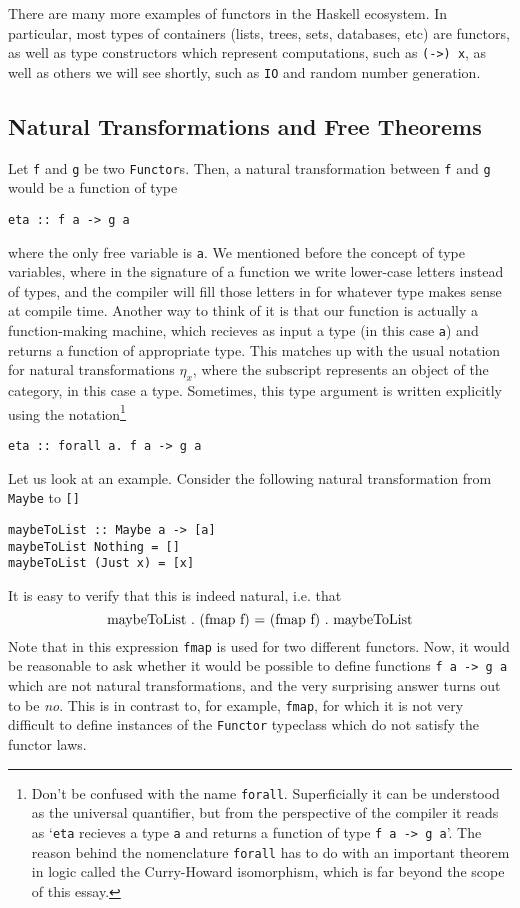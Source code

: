 \documentclass[11pt]{article}
\theoremstyle{nonumberplain}
\newcommand*\lsin{\lstinline}
\newcommand*\lsmath[1]{\text{\lstinline|#1|}}
\begin{document}
There are many more examples of functors in the Haskell ecosystem. In particular, most types of containers (lists, trees, sets, databases, etc) are functors, as well as type constructors which represent computations, such as \lsin|(->) x|, as well as others we will see shortly, such as \lsin|IO| and random number generation.

\subsection{Natural Transformations and Free Theorems}

Let \lsin|f| and \lsin|g| be two \lsin|Functor|s. Then, a natural transformation between \lsin|f| and \lsin|g| would be a function of type
\begin{lstlisting}
eta :: f a -> g a
\end{lstlisting}
where the only free variable is \lsin|a|. We mentioned before the concept of type variables, where in the signature of a function we write lower-case letters instead of types, and the compiler will fill those letters in for whatever type makes sense at compile time. Another way to think of it is that our function is actually a function-making machine, which recieves as input a type (in this case \lsin|a|) and returns a function of appropriate type. This matches up with the usual notation for natural transformations $\eta_x$, where the subscript represents an object of the category, in this case a type. Sometimes, this type argument is written explicitly using the notation\footnote{Don't be confused with the name \lsin|forall|. Superficially it can be understood as the universal quantifier, but from the perspective of the compiler it reads as `\lsin|eta| recieves a type \lsin|a| and returns a function of type \lsin|f a -> g a|'. The reason behind the nomenclature \lsin|forall| has to do with an important theorem in logic called the Curry-Howard isomorphism, which is far beyond the scope of this essay.}
\begin{lstlisting}
eta :: forall a. f a -> g a
\end{lstlisting}

Let us look at an example. Consider the following natural transformation from \lsin|Maybe| to \lsin|[]|
\begin{lstlisting}
maybeToList :: Maybe a -> [a]
maybeToList Nothing = []
maybeToList (Just x) = [x]
\end{lstlisting}

It is easy to verify that this is indeed natural, i.e. that
\begin{equation}
\lsmath{maybeToList . (fmap f) = (fmap f) . maybeToList}
\end{equation}
Note that in this expression \lsin|fmap| is used for two different functors. Now, it would be reasonable to ask whether it would be possible to define functions \lsin|f a -> g a| which are not natural transformations, and the very surprising answer turns out to be \emph{no}. This is in contrast to, for example, \lsin|fmap|, for which it is not very difficult to define instances of the \lsin|Functor| typeclass which do not satisfy the functor laws.
\end{document}
